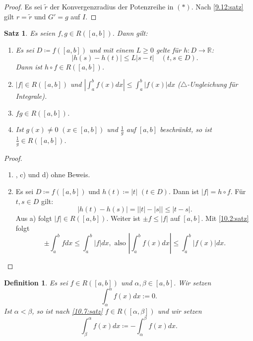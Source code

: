 \documentclass[12pt]{extreport} %
\newcommand{\R}{\mathbb{R}}
\theoremstyle{named}
\theoremstyle{itshape}
\newtheorem{satz}[unnamedtheorem]{Satz}
\newtheorem*{definition}{Definition}
\theoremstyle{normal}
\begin{document}
{\begin{proof}
	Es sei $\tilde{r}$ der Konvergenzradius der Potenzreihe in $(\ast)$. Nach \ref{9.12:satz} gilt $r = \tilde{r}$ und $G' = g$ auf $I$.	
\end{proof}


\begin{satz} \label{10.10:satz}
	Es seien $f, g \in R([a, b])$. Dann gilt:
	\begin{enumerate}
		\item Es sei $D \coloneqq f([a, b])$ und mit einem $L \geq 0$ gelte für $h \colon D \rightarrow \R$:
			$$ |h(s) - h(t)| \leq L |s - t| \quad (t, s \in D). $$
			Dann ist $h \circ f \in R([a, b])$.
		\item $|f| \in R([a, b])$ und $|\int_{a}^{b} f(x) dx| \leq \int_{a}^{b} |f(x)| dx$ ($\triangle$-Ungleichung für Integrale).
		\item $fg \in R([a, b])$.
		\item Ist $g(x) \neq 0$ $(x \in [a, b])$ und $\frac{1}{g}$ auf $[a, b]$ beschränkt, so ist $\frac{1}{g} \in R([a, b])$.
	\end{enumerate}
\end{satz}

\begin{proof} ~\
	\begin{enumerate}
		\item, c) und d) ohne Beweis.
		\item Es sei $D \coloneqq f([a, b])$ und $h(t) \coloneqq |t|$ $(t \in D)$. Dann ist $|f| = h \circ f$. Für $t, s \in D$ gilt: 
			$$ |h(t) - h(s)| = \left| |t| - |s| \right| \le |t - s|. $$
			Aus a) folgt $|f| \in R([a, b])$. Weiter ist $\pm f \leq |f|$ auf $[a, b]$. Mit \ref{10.2:satz} folgt 
			$$ \pm \int_{a}^{b} f dx \leq \int_{a}^{b} |f| dx, \text { also }  |\int_{a}^{b} f(x) dx| \leq \int_{a}^{b} |f(x)| dx. $$
			
	\end{enumerate}
\end{proof}


\begin{definition}
	Es sei $f \in R([a, b])$ und $\alpha, \beta \in [a, b]$. Wir setzen
	$$\int_{\alpha}^{\alpha} f(x) dx := 0.$$ 
	Ist $\alpha < \beta$, so ist nach \ref{10.7:satz} $f \in R([\alpha, \beta])$ und wir setzen
	$$ \int_{\beta}^{\alpha} f(x) dx \coloneqq - \int_{\alpha}^{\beta} f(x) dx. $$
\end{definition}

}
\end{document}
